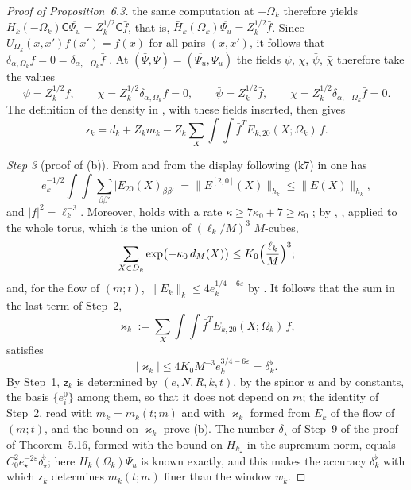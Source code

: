\documentclass[11pt]{amsart}
\theoremstyle{definition}
\begin{document}
\begin{proof}[Proof of Proposition~6.3]
the same computation at $-\Omega_k$ therefore yields $H_k(-\Omega_k)\mathsf C\overline{\Psi_u}=\allowbreak Z_k^{1/2}\mathsf C\bar f$, that is, $\bar H_k(\Omega_k)\overline{\Psi_u}=Z_k^{1/2}\bar f$.
Since $U_{\Omega_k}(x,x')f(x')=f(x)$ for all pairs $(x,x')$, it follows that $\delta_{\alpha,\Omega_k}f=0=\delta_{\alpha,-\Omega_k}\bar f$ \cite[(I.1.6), (I.1.7)]{QEDIII}.
At $(\bar\Psi,\Psi)=(\overline{\Psi_u},\Psi_u)$ the fields $\psi$, $\chi$, $\bar\psi$, $\bar\chi$ therefore take the values
\begin{equation*}
\psi=Z_k^{1/2}f,\qquad\chi=Z_k^{1/2}\delta_{\alpha,\Omega_k}f=0,\qquad\bar\psi=Z_k^{1/2}\bar f,\qquad\bar\chi=Z_k^{1/2}\delta_{\alpha,-\Omega_k}\bar f=0.
\end{equation*}
The definition of the density in \cite[Section~I.5.7, paragraph ``The density and the block transformation'']{QEDIII}, with these fields inserted, then gives
\begin{equation*}
\mathsf z_k=d_k+Z_km_k-Z_k\sum_X\int\!\!\int\bar f^{T}E_{k,20}(X;\Omega_k)\,f .
\end{equation*}

\emph{Step 3} (proof of (b)).
From \cite[Section~I.5.1, paragraphs ``The norms of the scheme'' and ``Matrix notation'']{QEDIII} and from the display following (k7) in \cite[Section~I.5.4]{QEDIII} one has
\begin{equation*}
e_k^{-1/2}\int\!\!\int\sum_{\beta\beta'}\bigl|E_{20}(X)_{\beta\beta'}\bigr|=\bigl\|E^{[2,0]}(X)\bigr\|_{h_k}\le\|E(X)\|_{h_k},
\end{equation*}
and $|f|^2=\ell_k^{-3}$.
Moreover, \cite[(k6)]{QEDIII} holds with a rate $\kappa\ge7\kappa_0+7\ge\kappa_0$ \cite[Section~I.8.2, line~(C2)]{QEDIII};
by \cite[Proposition~5.58\,(t2)]{QEDI}, \cite[Chapter~24, Section~0.6, (t2)]{QEDIII}, applied to the whole torus, which is the union of $(\ell_k/M)^3$ $M$-cubes,
\begin{equation*}
\sum_{X\in D_k}\exp\bigl(-\kappa_0\,d_M(X)\bigr)\le K_0\Bigl(\frac{\ell_k}M\Bigr)^3 ;
\end{equation*}
and, for the flow of $(m;t)$, $\|E_k\|_k\le4e_k^{1/4-6\varepsilon}$ by \cite[Proposition~28.1]{QEDIII}.
It follows that the sum in the last term of Step~2,
\begin{equation*}
\varkappa_k:=\sum_X\int\!\!\int\bar f^{T}E_{k,20}(X;\Omega_k)\,f,
\end{equation*}
satisfies
\begin{equation*}
|\varkappa_k|\le4K_0M^{-3}e_k^{3/4-6\varepsilon}=\delta^\flat_k .
\end{equation*}
By Step~1, $\mathsf z_k$ is determined by $(e,N,R,k,t)$, by the spinor $u$ and by constants, the basis $\{e_i^0\}$ among them, so that it does not depend on $m$;
the identity of Step~2, read with $m_k=m_k(t;m)$ and with $\varkappa_k$ formed from $E_k$ of the flow of $(m;t)$, and the bound on $\varkappa_k$ prove (b).
The number $\delta_\star$ of Step~9 of the proof of Theorem~5.16, formed with the bound on $H_{k_\star}$ in the supremum norm, equals $C_0^2e_\star^{-2\varepsilon}\delta^\flat_\star$;
here $H_k(\Omega_k)\Psi_u$ is known exactly, and this makes the accuracy $\delta^\flat_k$ with which $\mathsf z_k$ determines $m_k(t;m)$ finer than the window $w_k$.


\end{proof}
\end{document}
